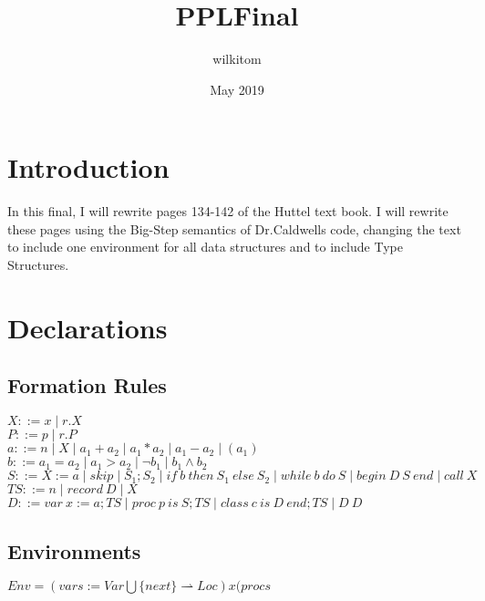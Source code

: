 \documentclass{article}
\title{PPLFinal}
\author{wilkitom }
\date{May 2019}
\begin{document}
\maketitle

\section{Introduction}
In this final, I will rewrite pages 134-142 of the Huttel text book. I will rewrite these pages using the Big-Step semantics of Dr.Caldwells code, changing the text to include one environment for all data structures and to include Type Structures. 

\section{Declarations}
\subsection{Formation Rules}
$X ::= x \mid r.X$\\
$P ::= p \mid r.P$\\
$a ::= n \mid X \mid a_1+a_2 \mid a_1*a_2 \mid a_1-a_2 \mid (a_1)$\\
$b ::= a_1 = a_2 \mid a_1 > a_2 \mid \neg b_1 \mid b_1 \wedge b_2$\\
$S ::= X := a \mid skip \mid S_1 ; S_2 \mid if \: b \: then \: S_1 \: else \: S_2 \mid while \: b \: do \: S \mid begin \: D \: S \: end \mid call \: X$\\
$TS ::= n \mid record \: D \mid X$\\
$D ::= var \: x := a;TS \mid proc \:p\: is\: S;TS \mid class\: c\: is \:D \:end;TS \mid D\: D$

\subsection{Environments}
$Env = (vars := Var \bigcup \{next\} \rightharpoonup Loc) x (procs $
\end{document}
